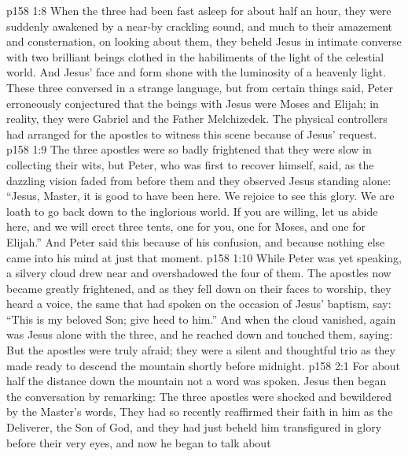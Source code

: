 \vs p158 1:8 When the three had been fast asleep for about half an hour, they were suddenly awakened by a near-by crackling sound, and much to their amazement and consternation, on looking about them, they beheld Jesus in intimate converse with two brilliant beings clothed in the habiliments of the light of the celestial world. And Jesus’ face and form shone with the luminosity of a heavenly light. These three conversed in a strange language, but from certain things said, Peter erroneously conjectured that the beings with Jesus were Moses and Elijah; in reality, they were Gabriel and the Father Melchizedek. The physical controllers had arranged for the apostles to witness this scene because of Jesus’ request.
\vs p158 1:9 The three apostles were so badly frightened that they were slow in collecting their wits, but Peter, who was first to recover himself, said, as the dazzling vision faded from before them and they observed Jesus standing alone: “Jesus, Master, it is good to have been here. We rejoice to see this glory. We are loath to go back down to the inglorious world. If you are willing, let us abide here, and we will erect three tents, one for you, one for Moses, and one for Elijah.” And Peter said this because of his confusion, and because nothing else came into his mind at just that moment.
\vs p158 1:10 While Peter was yet speaking, a silvery cloud drew near and overshadowed the four of them. The apostles now became greatly frightened, and as they fell down on their faces to worship, they heard a voice, the same that had spoken on the occasion of Jesus’ baptism, say: “This is my beloved Son; give heed to him.” And when the cloud vanished, again was Jesus alone with the three, and he reached down and touched them, saying:  But the apostles were truly afraid; they were a silent and thoughtful trio as they made ready to descend the mountain shortly before midnight.
\vs p158 2:1 For about half the distance down the mountain not a word was spoken. Jesus then began the conversation by remarking:  The three apostles were shocked and bewildered by the Master’s words,  They had so recently reaffirmed their faith in him as the Deliverer, the Son of God, and they had just beheld him transfigured in glory before their very eyes, and now he began to talk about 
